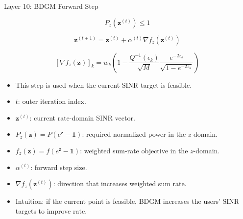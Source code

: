 \documentclass{beamer}
\begin{document}
\begin{frame}{Layer 10: BDGM Forward Step}
\scriptsize

\[
P_z(\mathbf{z}^{(t)})\le 1
\]

\[
\mathbf{z}^{(t+1)}
=
\mathbf{z}^{(t)}
+
\alpha^{(t)}
\nabla f_z(\mathbf{z}^{(t)})
\]

\[
[\nabla f_z(\mathbf{z})]_k
=
w_k
\left(
1
-
\frac{Q^{-1}(\epsilon_k)}{\sqrt{M}}
\frac{e^{-2z_k}}{\sqrt{1-e^{-2z_k}}}
\right)
\]

\begin{itemize}
    \item This step is used when the current SINR target is feasible.
    \item \(t\): outer iteration index.
    \item \(\mathbf{z}^{(t)}\): current rate-domain SINR vector.
    \item \(P_z(\mathbf{z})=P(e^{\mathbf{z}}-\mathbf{1})\): required normalized power in the \(z\)-domain.
    \item \(f_z(\mathbf{z})=f(e^{\mathbf{z}}-\mathbf{1})\): weighted sum-rate objective in the \(z\)-domain.
    \item \(\alpha^{(t)}\): forward step size.
    \item \(\nabla f_z(\mathbf{z}^{(t)})\): direction that increases weighted sum rate.
    \item Intuition: if the current point is feasible, BDGM increases the users' SINR targets to improve rate.
\end{itemize}

\end{frame}
\end{document}
